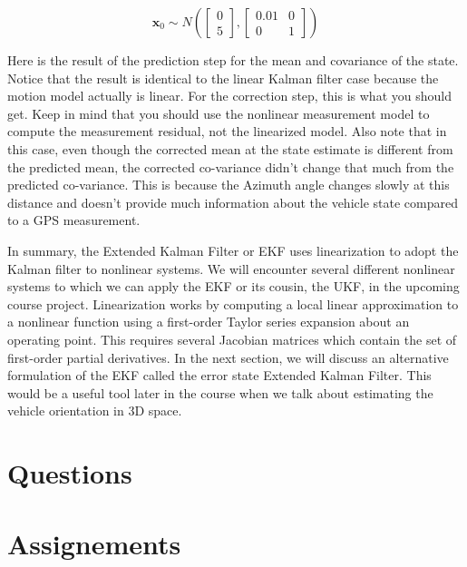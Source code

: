 \begin{equation}
\hat{\mathbf{x}}_0 \sim N(\begin{bmatrix}0 \\ 5 \end{bmatrix}, \begin{bmatrix}0.01 & 0 \\ 0 & 1 \end{bmatrix})
\end{equation}

Here is the result of the prediction step for the mean and
covariance of the state. Notice that the result is identical to the linear Kalman filter case because
the motion model actually is linear. For the correction step, this is what you should get. Keep in mind that you should use the nonlinear measurement model to
compute the measurement residual, not the linearized model. Also note that in this case, even though the corrected mean at the state estimate is different
from the predicted mean, the corrected co-variance didn't change that much from the predicted co-variance. This is because the Azimuth angle
changes slowly at this distance and doesn't provide
much information about the vehicle state compared
to a GPS measurement. 


In summary, the Extended Kalman Filter or EKF uses linearization to adopt
the Kalman filter to nonlinear systems. We will encounter several different nonlinear systems to which we can apply
the EKF or its cousin, the UKF, in the upcoming course project. Linearization works by computing
a local linear approximation to a nonlinear function using a first-order Taylor series expansion
about an operating point. This requires several Jacobian matrices which contain the set of
first-order partial derivatives. In the next section, we will discuss an
alternative formulation of the EKF called the error
state Extended Kalman Filter. This would be a useful tool later
in the course when we talk about estimating the vehicle
orientation in 3D space.

\section{Questions}


\section{Assignements}

